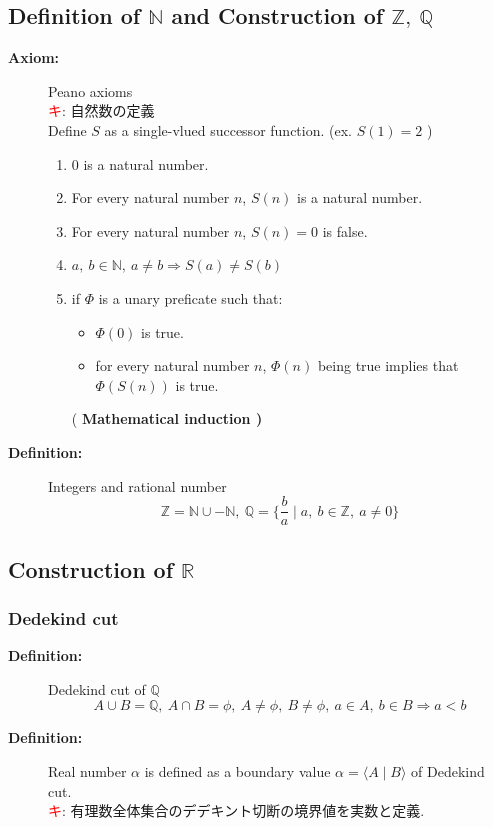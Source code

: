 \documentclass[english,dvipdfmx]{jsarticle}
\newcommand{\average}[1]{\ensuremath{\langle#1\rangle} }
\newcommand*{\point}{\textcircled{\textcolor{red}{\scriptsize キ}}}
\begin{document}
    \subsection{Definition of $\mathbb{N}$ and Construction of $\mathbb{Z},\ \mathbb{Q}$}
    \begin{description}
        \item[\bf{Axiom:}] Peano axioms \\
        \point : 自然数の定義 \\
        Define $S$ as a single-vlued successor function. (ex. $S(1) = 2$ )
        \begin{enumerate}
            \item $0$ is a natural number.
            \item For every natural number $n$, $S(n)$ is a natural number.
            \item For every natural number $n$, $S(n) = 0$ is false.
            \item $a,\ b \in \mathbb{N},\ a \neq b \Rightarrow S(a) \neq S(b)$
            \item if $\Phi$ is a unary preficate such that: 
                \begin{itemize}
                    \item $\Phi(0)$ is true.
                    \item for every natural number $n$, $\Phi(n)$ being true implies that $\Phi(S(n))$ is true.
                \end{itemize}
                ( \bf{Mathematical induction} )
        \end{enumerate}
        \item[\bf{Definition:}] Integers and rational number
            \begin{equation*}  
            \mathbb{Z} = \mathbb{N} \cup -\mathbb{N} ,\ \mathbb{Q} = \{ \frac{b}{a} \mid a,\ b \in \mathbb{Z},\ a \neq 0 \}
            \end{equation*}
    \end{description}
    \subsection{Construction of $\mathbb{R}$}
    \subsubsection{Dedekind cut}
    \begin{description}
    \item[\bf{Definition:}] Dedekind cut of $\mathbb{Q}$
        \begin{equation*}
            A \cup B = \mathbb{Q},\ A \cap B = \phi,\ A \neq \phi,\ B \neq \phi,\ a \in A,\ b \in B \Rightarrow a < b
        \end{equation*}
    \item[\bf{Definition:}] Real number $\alpha$ is defined as a boundary value $\alpha = \average{A \mid B}$ of Dedekind cut. \\
        \point : 有理数全体集合のデデキント切断の境界値を実数と定義.
    \end{description}
\end{document}
